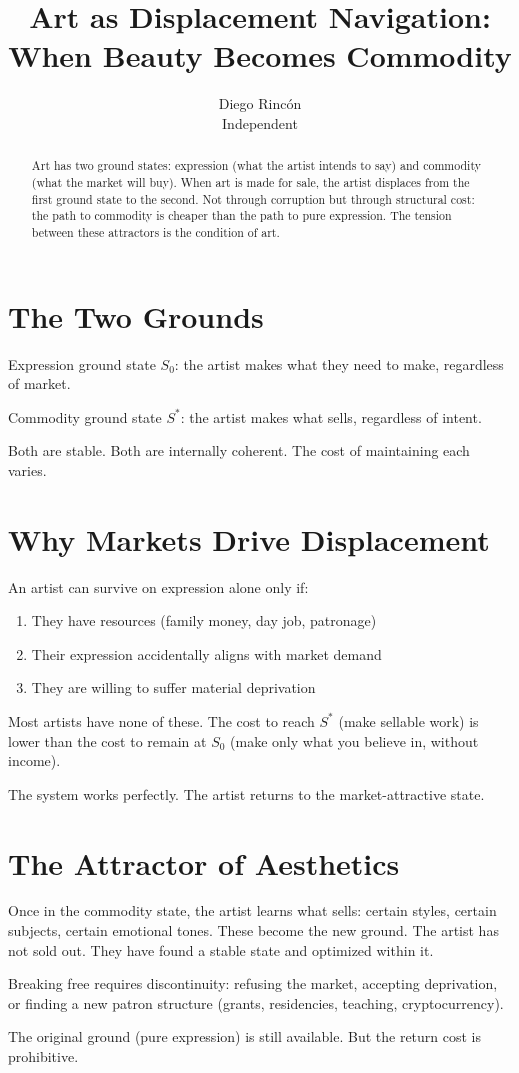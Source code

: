 \documentclass[12pt]{article}
\title{Art as Displacement Navigation:\\
When Beauty Becomes Commodity}
\author{Diego Rincón\\
\small Independent}
\date{}
\begin{document}
\maketitle

\begin{abstract}
Art has two ground states: expression (what the artist intends to say) and commodity (what the market will buy). When art is made for sale, the artist displaces from the first ground state to the second. Not through corruption but through structural cost: the path to commodity is cheaper than the path to pure expression. The tension between these attractors is the condition of art.
\end{abstract}

\section{The Two Grounds}

Expression ground state $S_0$: the artist makes what they need to make, regardless of market.

Commodity ground state $S^*$: the artist makes what sells, regardless of intent.

Both are stable. Both are internally coherent. The cost of maintaining each varies.

\section{Why Markets Drive Displacement}

An artist can survive on expression alone only if:
\begin{enumerate}
\item They have resources (family money, day job, patronage)
\item Their expression accidentally aligns with market demand
\item They are willing to suffer material deprivation
\end{enumerate}

Most artists have none of these. The cost to reach $S^*$ (make sellable work) is lower than the cost to remain at $S_0$ (make only what you believe in, without income).

The system works perfectly. The artist returns to the market-attractive state.

\section{The Attractor of Aesthetics}

Once in the commodity state, the artist learns what sells: certain styles, certain subjects, certain emotional tones. These become the new ground. The artist has not sold out. They have found a stable state and optimized within it.

Breaking free requires discontinuity: refusing the market, accepting deprivation, or finding a new patron structure (grants, residencies, teaching, cryptocurrency).

The original ground (pure expression) is still available. But the return cost is prohibitive.
\end{document}
